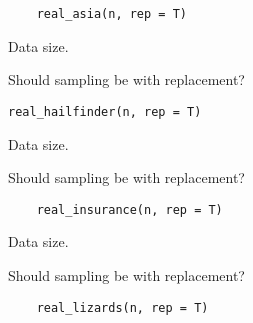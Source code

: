 \documentclass[letterpaper]{book}
\begin{document}
%
\begin{Usage}
\begin{verbatim}
	real_asia(n, rep = T)
\end{verbatim}
\end{Usage}
%
\begin{Arguments}
\begin{ldescription}
\item[\code{n}]  Data size. 
\item[\code{rep}]  Should sampling be with replacement? 
\end{ldescription}
\end{Arguments}
%
\begin{Usage}
\begin{verbatim}
real_hailfinder(n, rep = T)
\end{verbatim}
\end{Usage}
%
\begin{Arguments}
\begin{ldescription}
\item[\code{n}]  Data size. 
\item[\code{rep}]  Should sampling be with replacement? 
\end{ldescription}
\end{Arguments}
%
\begin{Usage}
\begin{verbatim}
	real_insurance(n, rep = T)
\end{verbatim}
\end{Usage}
%
\begin{Arguments}
\begin{ldescription}
\item[\code{n}]  Data size. 
\item[\code{rep}]  Should sampling be with replacement? 
\end{ldescription}
\end{Arguments}
%
\begin{Usage}
\begin{verbatim}
	real_lizards(n, rep = T)
\end{verbatim}
\end{Usage}
\end{document}
